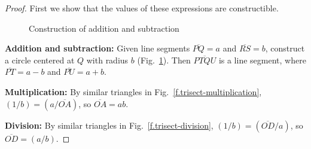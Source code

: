 \begin{proof} First we show that the values of these expressions are constructible.

\medskip

\begin{figure}[b]
\begin{center}
\end{center}
\caption{Construction of addition and subtraction}\label{f.trisect-add-subtract}
\end{figure}

\noindent\textbf{Addition and subtraction:}
Given line segments $\overline{PQ}=a$ and $\overline{RS}=b$, construct a circle centered at $Q$ with radius $b$ (Fig.~\ref{f.trisect-add-subtract}). Then $\overline{PTQU}$ is a line segment, where $\overline{PT}=a-b$ and $\overline{PU}=a+b$.

\newpage

\noindent\textbf{Multiplication:}
By similar triangles in Fig.~\ref{f.trisect-multiplication},
$(1/b)=(a/\overline{OA})$, so $\overline{OA}=ab$.

\medskip

\noindent\textbf{Division:}
By similar triangles in Fig.~\ref{f.trisect-division},
$(1/b)=(\overline{OD}/a)$, so $\overline{OD}=(a/b)$.


\end{proof}
